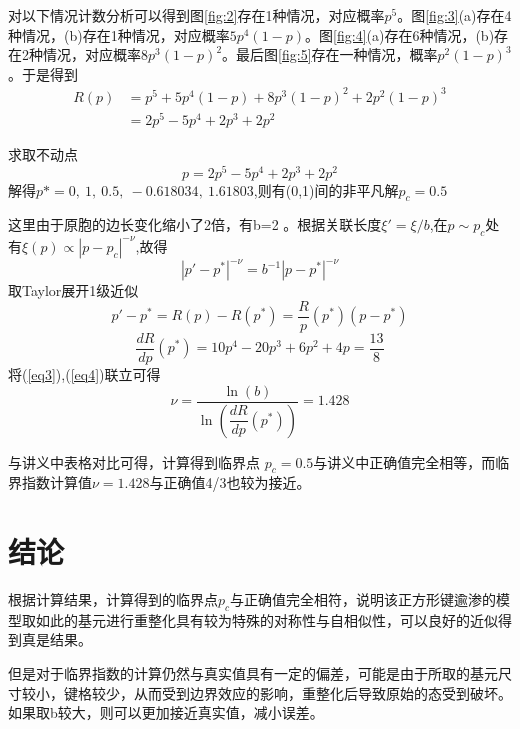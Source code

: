 \documentclass{article}
\begin{document}
对以下情况计数分析可以得到图\ref{fig:2}存在1种情况，对应概率$ p^5 $。图\ref{fig:3}(a)存在4种情况，(b)存在1种情况，对应概率$ 5p^4(1-p) $。图\ref{fig:4}(a)存在6种情况，(b)存在2种情况，对应概率$ 8p^3(1-p)^2 $。最后图\ref{fig:5}存在一种情况，概率$ p^2(1-p)^3 $。于是得到
\begin{equation}
	\begin{aligned}
		R(p)&=p^5+5p^4(1-p)+8p^3(1-p)^2+2p^2(1-p)^3\\
		&=2p^5-5p^4+2p^3+2p^2
	\end{aligned}
\end{equation}


求取不动点
\begin{equation}
	p=2p^5-5p^4+2p^3+2p^2
\end{equation}
解得$ p*=0,\ 1,\ 0.5,\ -0.618034,\ 1.61803 $,则有(0,1)间的非平凡解$ p_c=0.5 $


这里由于原胞的边长变化缩小了2倍，有b=2 。根据关联长度$ \xi'=\xi/b $,在$ p\sim p_c $处有$ \xi(p)\propto |p-p_c|^{-\nu} $,故得
\begin{equation}
	|p'-p^*|^{-\nu}=b^{-1}|p-p^*|^{-\nu}
	\label{eq3}
\end{equation}
取Taylor展开1级近似
\begin{equation}
	p'-p^*=R(p)-R(p^*)=\dfrac{R}{p}(p^*)(p-p^*)
	\label{eq4}
\end{equation}
\begin{equation}
	\dfrac{dR}{dp}(p^*)=10p^4-20p^3+6p^2+4p=\frac{13}{8}
\end{equation}
将(\ref{eq3}),(\ref{eq4})联立可得
\begin{equation}
	\nu=\frac{\ln(b)}{\ln(\dfrac{dR}{dp}(p^*))}=1.428
\end{equation}


与讲义中表格对比可得，计算得到临界点 $ p_c=0.5 $与讲义中正确值完全相等，而临界指数计算值$ \nu=1.428 $与正确值4/3也较为接近。
	\section{结论}
	根据计算结果，计算得到的临界点$ p_c $与正确值完全相符，说明该正方形键逾渗的模型取如此的基元进行重整化具有较为特殊的对称性与自相似性，可以良好的近似得到真是结果。
	
	
	但是对于临界指数的计算仍然与真实值具有一定的偏差，可能是由于所取的基元尺寸较小，键格较少，从而受到边界效应的影响，重整化后导致原始的态受到破坏。如果取b较大，则可以更加接近真实值，减小误差。
\end{document}
